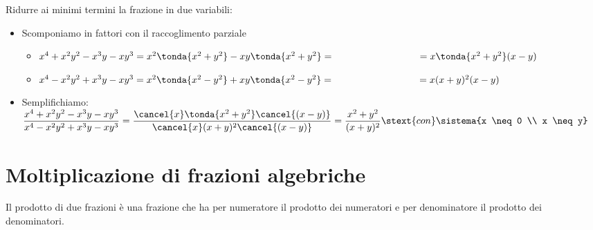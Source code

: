 \begin{esempio}{}{}
Ridurre ai minimi termini la frazione in due variabili:\\
\begin{itemize}[left=0mm, nosep]
\item Scomponiamo in fattori con il raccoglimento parziale
\begin{itemize}[nosep]
\item \(x^{4}+x^{2}y^{2}-x^{3}y-xy^{3}=
x^{2}  \tonda{x^{2}+y^{2}} -xy  \tonda{x^{2}+y^{2}} =\newline
\hspace*{30mm}= x \tonda{x^{2}+y^{2}}  (x-y)\)
\item \(x^{4}-x^{2}y^{2}+x^{3}y-xy^{3}=
x^{2}  \tonda{x^{2}-y^{2}} +xy  \tonda{x^{2}-y^{2}} =\newline
\hspace*{30mm}= x (x+y)^{2} (x-y)\)
\end{itemize}
\item Semplifichiamo:\\
\hspace*{-5mm}
\(\dfrac{x^{4}+x^{2}y^{2}-x^{3}y-xy^{3}}
      {x^{4}-x^{2}y^{2}+x^{3}y-xy^{3}}=
\dfrac{\cancel{x}  \tonda{x^{2}+y^{2}}  \cancel{(x-y)}}
      {\cancel{x}(x+y)^{2} \cancel{(x-y)}}=\dfrac{x^2+y^2}{(x+y)^2} 
\stext{ con } \sistema{x \neq 0 \\ x \neq y}\)
\end{itemize}
\end{esempio}



\section{Moltiplicazione di frazioni algebriche}
\label{sec:frazalg_moltiplicazione}

Il prodotto di due frazioni 
è una frazione che ha per numeratore il prodotto dei numeratori e 
per denominatore il prodotto dei denominatori.


